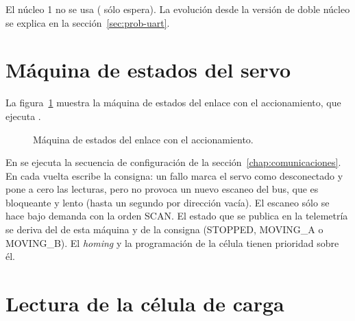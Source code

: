 El núcleo 1 no se usa ( sólo espera). La evolución desde la versión de doble núcleo
se explica en la sección~\ref{sec:prob-uart}.

\section{Máquina de estados del servo}

La figura~\ref{fig:fsm-servo} muestra la máquina de estados del enlace con el accionamiento, que
ejecuta .

\begin{figure}[H]
\centering
{}
\caption{Máquina de estados del enlace con el accionamiento.}
\label{fig:fsm-servo}
\end{figure}

En  se ejecuta la secuencia de configuración de la
sección~\ref{chap:comunicaciones}. En  cada vuelta escribe la consigna: un fallo
marca el servo como desconectado y pone a cero las lecturas, pero no provoca un nuevo escaneo del
bus, que es bloqueante y lento (hasta un segundo por dirección vacía). El escaneo sólo se hace bajo
demanda con la orden SCAN. El estado que se publica en la telemetría se deriva del de esta máquina y
de la consigna (STOPPED, MOVING\_A o MOVING\_B). El \emph{homing} y la programación de la célula
tienen prioridad sobre él.

\section{Lectura de la célula de carga}

